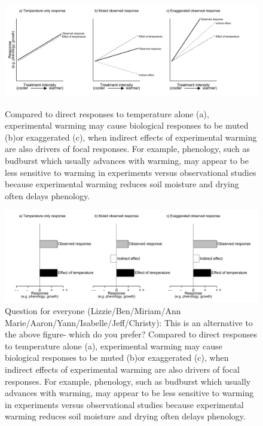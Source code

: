 \documentclass{article}
\begin{document}
 \clearpage
 \begin{figure}[h]
  \includegraphics{../Analyses/figures/DirIndWarmingEffects.pdf}  
 \caption{Compared to direct responses to temperature alone (a), experimental warming may cause biological responses to be muted (b)or exaggerated (c), when indirect effects of experimental warming are also drivers of focal responses. For example, phenology, such as budburst which usually advances with warming, may appear to be less sensitive to warming in experiments versus observational studies \citep{wolkovich2012} because experimental warming reduces soil moisture and drying often delays phenology.}
\label{fig:biolimp}
\includegraphics{../Analyses/figures/DirIndWarmingEffects_bar.pdf}   
\caption{Question for everyone (Lizzie/Ben/Miriam/Ann Marie/Aaron/Yann/Isabelle/Jeff/Christy): This is an alternative to the above figure- which do you prefer? Compared to direct responses to temperature alone (a), experimental warming may cause biological responses to be muted (b)or exaggerated (c), when indirect effects of experimental warming are also drivers of focal responses. For example, phenology, such as budburst which usually advances with warming, may appear to be less sensitive to warming in experiments versus observational studies \citep{wolkovich2012} because experimental warming reduces soil moisture and drying often delays phenology.} 
 \end{figure}
\end{document}
